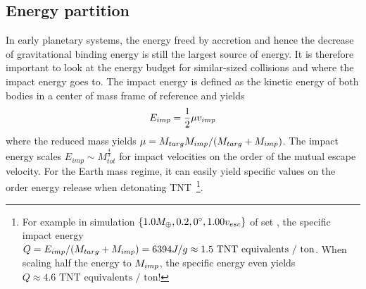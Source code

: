 

\subsection{Energy partition}
In early planetary systems, the energy freed by accretion and hence the decrease of gravitational binding energy is still the largest source of energy. It is therefore important to look at the energy budget for similar-sized collisions and where the impact energy goes to. The impact energy is defined as the kinetic energy of both bodies in a center of mass frame of reference and yields
\begin{align}
E_{imp} = \frac{1}{2} \mu v_{imp}
\end{align}
where the reduced mass yields $\mu = M_{targ} M_{imp} / ( M_{targ} + M_{imp} )$. The impact energy scales $E_{imp} \sim M_{tot}^\frac{4}{3}$ for impact velocities on the order of the mutual escape velocity. For the Earth mass regime, it can easily yield specific values on the order energy release when detonating TNT \footnote{For example in simulation $\{ 1.0 M_{\oplus}, 0.2, 0 ^\circ, 1.00 v_{esc} \}$ of set \css, the specific impact energy $Q = E_{imp} / ( M_{targ} + M_{imp} ) = 6 394 J / g \approx 1.5 \textrm{ TNT equivalents / ton}$. When scaling half the energy to $M_{imp}$, the specific energy even yields $Q \approx 4.6 \textrm{ TNT equivalents / ton}$!}.


